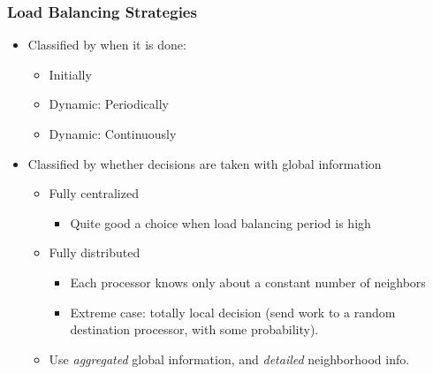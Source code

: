 %
%
\begin{frame}[fragile]
\frametitle{Load Balancing Strategies}
\begin{itemize}
 \item Classified by when it is done:
 \begin{itemize}
  \item Initially
  \item Dynamic: Periodically
  \item Dynamic: Continuously
 \end{itemize}
 \item Classified by whether decisions are taken with global information
 \begin{itemize}
  \item Fully centralized
  \begin{itemize}
   \item Quite good a choice when load balancing period is high
  \end{itemize}
 \item Fully distributed
 \begin{itemize}
  \item Each processor knows only about a constant number of neighbors
  \item Extreme case: totally local decision (send work to a random destination processor, with some probability).
 \end{itemize}
\item Use \emph{aggregated} global  information, and \emph{detailed} neighborhood info.
\end{itemize}
\end{itemize}
\end{frame}

